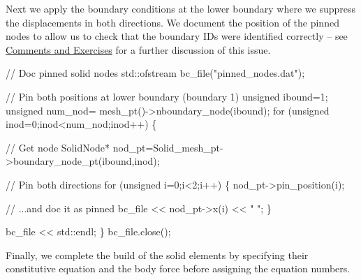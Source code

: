 Next we apply the boundary conditions at the lower boundary where we suppress the displacements in both directions. We document the position of the pinned nodes to allow us to check that the boundary I\+Ds were identified correctly -- see \hyperlink{index_comm_ex}{Comments and Exercises} for a further discussion of this issue.


\begin{DoxyCodeInclude}
 
 \textcolor{comment}{// Doc pinned solid nodes}
 std::ofstream bc\_file(\textcolor{stringliteral}{"pinned\_nodes.dat"});

 \textcolor{comment}{// Pin both positions at lower boundary (boundary 1)}
 \textcolor{keywordtype}{unsigned} ibound=1;
 \textcolor{keywordtype}{unsigned} num\_nod= mesh\_pt()->nboundary\_node(ibound);
 \textcolor{keywordflow}{for} (\textcolor{keywordtype}{unsigned} inod=0;inod<num\_nod;inod++)
  \{  

   \textcolor{comment}{// Get node}
   SolidNode* nod\_pt=Solid\_mesh\_pt->boundary\_node\_pt(ibound,inod);
   
   \textcolor{comment}{// Pin both directions}
   \textcolor{keywordflow}{for} (\textcolor{keywordtype}{unsigned} i=0;i<2;i++)
    \{
     nod\_pt->pin\_position(i);
     
     \textcolor{comment}{// ...and doc it as pinned}
     bc\_file << nod\_pt->x(i) << \textcolor{stringliteral}{" "};
    \}

   bc\_file << std::endl;
  \}
 bc\_file.close();

\end{DoxyCodeInclude}


Finally, we complete the build of the solid elements by specifying their constitutive equation and the body force before assigning the equation numbers.



